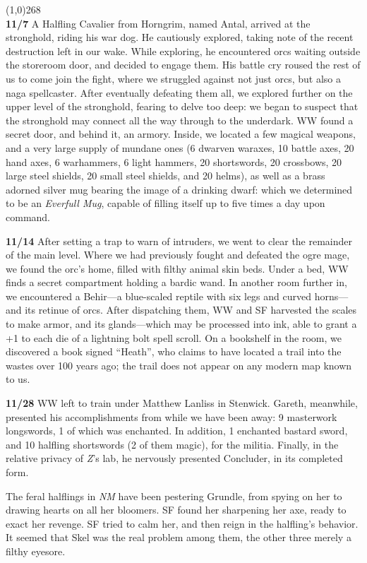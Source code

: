 \documentclass[letterpaper]{article}
\newcommand{\colline}{\noindent\line(1,0){268} \\}
\newcommand{\e}[1]{\emph{#1}}
\newcommand{\B}[1]{\textbf{#1}}
\newenvironment{notesection}[1]
{\noindent {\huge \B{#1}} \par
\vspace{-0.75em}
\colline
\begingroup\fontsize{9pt}{12pt}\selectfont}
{\endgroup}
\begin{document}
\begin{notesection}{Events}
{\color{Red}\B{11/7}} A Halfling Cavalier from Horngrim, named Antal, arrived at the stronghold, riding his war dog.  He cautiously explored, taking note of the recent destruction left in our wake.  While exploring, he encountered orcs waiting outside the storeroom door, and decided to engage them.  His battle cry roused the rest of us to come join the fight, where we struggled against not just orcs, but also a naga spellcaster.  After eventually defeating them all, we explored further on the upper level of the stronghold, fearing to delve too deep: we began to suspect that the stronghold may connect all the way through to the underdark.  WW found a secret door, and behind it, an armory.  Inside, we located a few magical weapons, and a very large supply of mundane ones (6 dwarven waraxes, 10 battle axes, 20 hand axes, 6 warhammers, 6 light hammers, 20 shortswords, 20 crossbows, 20 large steel shields, 20 small steel shields, and 20 helms), as well as a brass adorned silver mug bearing the image of a drinking dwarf: which we determined to be an \e{Everfull Mug}, capable of filling itself up to five times a day upon command. 

{\color{Red}\B{11/14}} After setting a trap to warn of intruders, we went to clear the remainder of the main level.  Where we had previously fought and defeated the ogre mage, we found the orc's home, filled with filthy animal skin beds.  Under a bed, WW finds a secret compartment holding a bardic wand.  In another room further in, we encountered a Behir---a blue-scaled reptile with six legs and curved horns---and its retinue of orcs.  After dispatching them, WW and SF harvested the scales to make armor, and its glands---which may be processed into ink, able to grant a +1 to each die of a lightning bolt spell scroll. On a bookshelf in the room, we discovered a book signed ``Heath'', who claims to have located a trail into the wastes over 100 years ago; the trail does not appear on any modern map known to us.

{\color{Red}\B{11/28}} WW left to train under Matthew Lanliss in Stenwick.   Gareth, meanwhile, presented his accomplishments from while we have been away: 9 masterwork longswords, 1 of which was enchanted. In addition, 1 enchanted bastard sword, and 10 halfling shortswords (2 of them magic), for the militia. Finally, in the relative privacy of \e{Z}'s lab, he nervously presented Concluder, in its completed form.

The feral halflings in \e{NM} have been pestering Grundle, from spying on her to drawing hearts on all her bloomers. SF found her sharpening her axe, ready to exact her revenge.  SF tried to calm her, and then reign in the halfling's behavior.  It seemed that Skel was the real problem among them, the other three merely a filthy eyesore.


\end{notesection}
\end{document}
